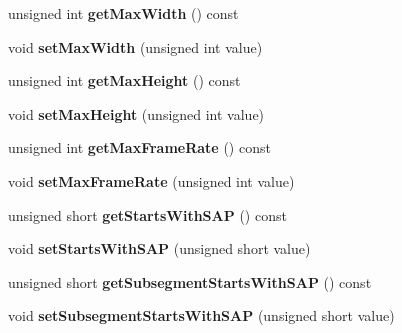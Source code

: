 \begin{DoxyCompactItemize}
\item 
\hypertarget{class_adaptation_set_a56444676bc11e033739dfb284906563d}{unsigned int {\bfseries get\-Max\-Width} () const }\label{class_adaptation_set_a56444676bc11e033739dfb284906563d}

\item 
\hypertarget{class_adaptation_set_a57664056fa1a9ab26be60b39e40db91b}{void {\bfseries set\-Max\-Width} (unsigned int value)}\label{class_adaptation_set_a57664056fa1a9ab26be60b39e40db91b}

\item 
\hypertarget{class_adaptation_set_a3b459da1a90efed749b4f98c4ca4a59a}{unsigned int {\bfseries get\-Max\-Height} () const }\label{class_adaptation_set_a3b459da1a90efed749b4f98c4ca4a59a}

\item 
\hypertarget{class_adaptation_set_ab31270b5a5222441b1ce1107eb88882e}{void {\bfseries set\-Max\-Height} (unsigned int value)}\label{class_adaptation_set_ab31270b5a5222441b1ce1107eb88882e}

\item 
\hypertarget{class_adaptation_set_ac3162935bbeb8819fcb6f8edc9cd212b}{unsigned int {\bfseries get\-Max\-Frame\-Rate} () const }\label{class_adaptation_set_ac3162935bbeb8819fcb6f8edc9cd212b}

\item 
\hypertarget{class_adaptation_set_a05425b2202c0251d46451b8f857aad30}{void {\bfseries set\-Max\-Frame\-Rate} (unsigned int value)}\label{class_adaptation_set_a05425b2202c0251d46451b8f857aad30}

\item 
\hypertarget{class_adaptation_set_a64dc208ac9c61137228970f2caf8656e}{unsigned short {\bfseries get\-Starts\-With\-S\-A\-P} () const }\label{class_adaptation_set_a64dc208ac9c61137228970f2caf8656e}

\item 
\hypertarget{class_adaptation_set_a9ea5b3ba16531eeae0157cdcceecb1a8}{void {\bfseries set\-Starts\-With\-S\-A\-P} (unsigned short value)}\label{class_adaptation_set_a9ea5b3ba16531eeae0157cdcceecb1a8}

\item 
\hypertarget{class_adaptation_set_ac19742543a7d2e07455c7bcdcbbbbd27}{unsigned short {\bfseries get\-Subsegment\-Starts\-With\-S\-A\-P} () const }\label{class_adaptation_set_ac19742543a7d2e07455c7bcdcbbbbd27}

\item 
\hypertarget{class_adaptation_set_a5ca94f383ef91de91fda496c5e389f2c}{void {\bfseries set\-Subsegment\-Starts\-With\-S\-A\-P} (unsigned short value)}\label{class_adaptation_set_a5ca94f383ef91de91fda496c5e389f2c}


\end{DoxyCompactItemize}

